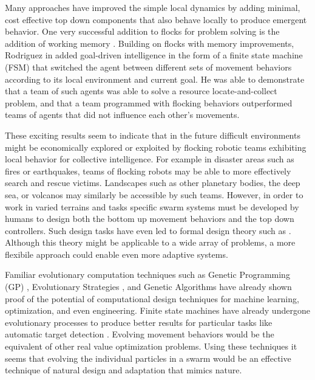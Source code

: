 \documentclass[12pt,journal,compsoc]{IEEEtran}
\begin{document}
Many approaches have improved the simple local dynamics by adding minimal, cost effective top down components that also behave locally to produce emergent behavior. One very successful addition to flocks for problem solving is the addition of working memory \cite{winder2012role,hu2003particle}. Building on flocks with memory improvements, Rodriguez in \cite{rodriguez2004extending} added goal-driven intelligence in the form of a finite state machine (FSM) that switched the agent between different sets of movement behaviors according to its local environment and current goal. He was able to demonstrate that a team of such agents was able to solve a resource locate-and-collect problem, and that a team programmed with flocking behaviors outperformed teams of agents that did not influence each other's movements.

These exciting results seem to indicate that in the future difficult environments might be economically explored or exploited by flocking robotic teams exhibiting local behavior for collective intelligence. For example in disaster areas such as fires or earthquakes, teams of flocking robots may be able to more effectively search and rescue victims. Landscapes such as other planetary bodies, the deep sea, or volcanos may similarly be accessible by such teams. However, in order to work in varied terrains and tasks specific swarm systems must be developed by humans to design both the bottom up movement behaviors and the top down controllers. Such design tasks have even led to formal design theory such as \cite{mataric1993designing,capera2003amas}. Although this theory might be applicable to a wide array of problems, a more flexibile approach could enable even more adaptive systems.

Familiar evolutionary computation techniques such as Genetic Programming (GP) \cite{koza1992genetic}, Evolutionary Strategies \cite{rechenberg1989evolution}, and Genetic Algorithms \cite{goldberg1988genetic} have already shown proof of the potential of computational design techniques for machine learning, optimization, and even engineering. Finite state machines have already undergone evolutionary processes to produce better results for particular tasks like automatic target detection \cite{benson2000evolving}. Evolving movement behaviors would be the equivalent of other real value optimization problems. Using these techniques it seems that evolving the individual particles in a swarm would be an effective technique of natural design and adaptation that mimics nature.
\end{document}
